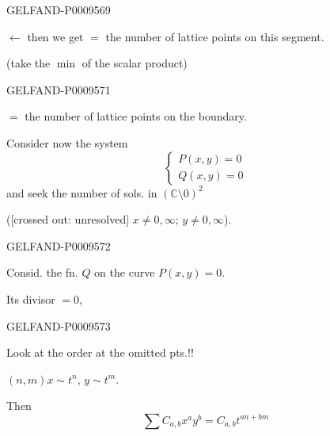 \begin{GelfandAdjacentEvidence}{GELFAND-P000956}{9}

$\leftarrow$ then we get $=$ the number of lattice points on this segment.
\end{GelfandAdjacentEvidence}


(take the $\min$ of the scalar product)

\begin{GelfandAdjacentEvidence}{GELFAND-P000957}{1}

 $=$ the number of lattice points on the boundary.

Consider now the system
\begin{equation*}
 \begin{cases}
 P(x,y)=0\\
 Q(x,y)=0
 \end{cases}
 \tag{10}
\end{equation*}
and seek the number of sols. in $(\mathbb C\setminus0)^2$

([crossed out: unresolved] $x\ne0,\infty$; $y\ne0,\infty$).
\end{GelfandAdjacentEvidence}
\begin{GelfandAdjacentEvidence}{GELFAND-P000957}{2}


Consid. the fn. $Q$ on the curve $P(x,y)=0$.

Its divisor $=0$,
\end{GelfandAdjacentEvidence}
\begin{GelfandAdjacentEvidence}{GELFAND-P000957}{3}

Look at the order at the omitted pts.!!

$(n,m)$\qquad $x\sim t^n$, $y\sim t^m$.

Then
\begin{equation*}
 \sum C_{a,b}x^a y^b=C_{a,b}t^{an+bm}
 \tag{11}
\end{equation*}
\end{GelfandAdjacentEvidence}
